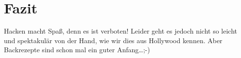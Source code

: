 \section{Fazit}
\label{sec:fazit}

Hacken macht Spaß, denn es ist verboten!
Leider geht es jedoch nicht so leicht und spektakulär von der Hand,
wie wir dies aus Hollywood kennen.
Aber Backrezepte sind schon mal ein guter Anfang\ldots ;-)
